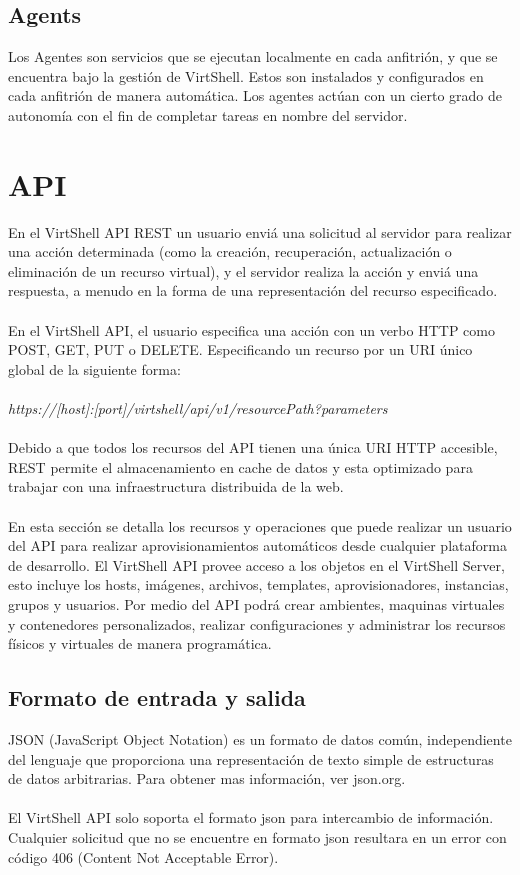 \documentclass[conference, spanish]{IEEEtran}
\begin{document}
\subsection{Agents}
Los Agentes son servicios que se ejecutan localmente en cada anfitrión, y que se encuentra bajo la gestión de VirtShell. Estos son instalados y configurados en cada anfitrión de manera automática. Los agentes actúan con un cierto grado de autonomía con el fin de completar tareas en nombre del servidor.\\

\section{API}
En el VirtShell API REST un usuario enviá una solicitud al servidor para realizar una acción determinada (como la creación, recuperación, actualización o eliminación de un recurso virtual), y el servidor realiza la acción y enviá una respuesta, a menudo en la forma de una representación del recurso especificado.\\
\\
En el VirtShell API, el usuario especifica una acción con un verbo HTTP como POST, GET, PUT o DELETE. Especificando un recurso por un URI único global de la siguiente forma: \\
\\
\emph{https://[host]:[port]/virtshell/api/v1/resourcePath?parameters}\\
\\
Debido a que todos los recursos del API tienen una única URI HTTP accesible, REST permite el almacenamiento en cache de datos y esta optimizado para trabajar con una infraestructura distribuida de la web.\\
\\
En esta sección se detalla los recursos y operaciones que puede realizar un usuario del API para realizar aprovisionamientos automáticos desde cualquier plataforma de desarrollo. El VirtShell API provee acceso a los objetos en el VirtShell Server, esto incluye los hosts, imágenes, archivos, templates, aprovisionadores, instancias, grupos y usuarios. Por medio del API podrá crear ambientes, maquinas virtuales y contenedores personalizados, realizar configuraciones y administrar los recursos físicos y virtuales de manera programática. \\

\subsection{Formato de entrada y salida}
JSON (JavaScript Object Notation) es un formato de datos común, independiente del lenguaje que proporciona una representación de texto simple de estructuras de datos arbitrarias. Para obtener mas información, ver json.org.\\
\\
El VirtShell API solo soporta el formato json para intercambio de información. Cualquier solicitud que no se encuentre en formato json resultara en un error con código 406 (Content Not Acceptable Error).
\end{document}
